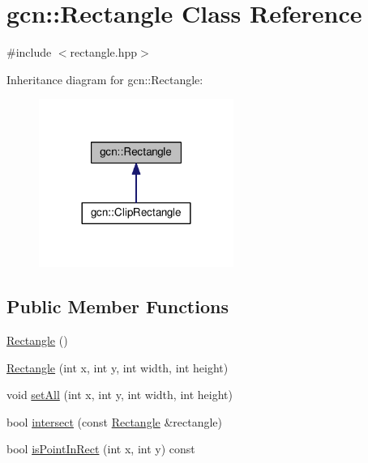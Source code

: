 \hypertarget{classgcn_1_1Rectangle}{}\section{gcn\+:\+:Rectangle Class Reference}
\label{classgcn_1_1Rectangle}


{\ttfamily \#include $<$rectangle.\+hpp$>$}



Inheritance diagram for gcn\+:\+:Rectangle\+:\nopagebreak
\begin{figure}[H]
\begin{center}
\leavevmode
\includegraphics[width=180pt]{classgcn_1_1Rectangle__inherit__graph}
\end{center}
\end{figure}
\subsection*{Public Member Functions}
\begin{DoxyCompactItemize}
\item 
\hyperlink{classgcn_1_1Rectangle_a5bde3ad67de45107822313ecfa965182}{Rectangle} ()
\item 
\hyperlink{classgcn_1_1Rectangle_ad2d7d6d90114946b3b538ebde665bd4a}{Rectangle} (int x, int y, int width, int height)
\item 
void \hyperlink{classgcn_1_1Rectangle_abceed0ef01fb4947960b0050df365db4}{set\+All} (int x, int y, int width, int height)
\item 
bool \hyperlink{classgcn_1_1Rectangle_ae92f66d26b05278708ea20fad4eef618}{intersect} (const \hyperlink{classgcn_1_1Rectangle}{Rectangle} \&rectangle)
\item 
bool \hyperlink{classgcn_1_1Rectangle_ad3586596cbb34b093267f4d1a474e2c9}{is\+Point\+In\+Rect} (int x, int y) const 
\end{DoxyCompactItemize}

